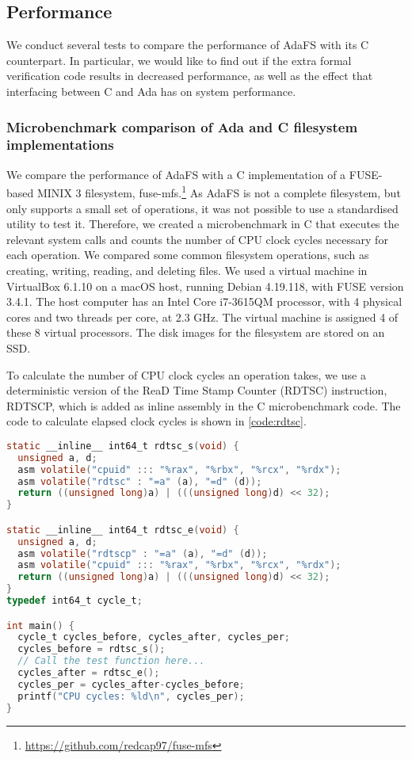 \subsection{Performance}
We conduct several tests to compare the performance of AdaFS with its C counterpart.
In particular, we would like to find out if the extra formal verification code results in decreased performance, as well as the effect that interfacing between C and Ada has on system performance.

\subsubsection{Microbenchmark comparison of Ada and C filesystem implementations}
We compare the performance of AdaFS with a C implementation of a FUSE-based MINIX 3 filesystem, fuse-mfs.\footnote{\url{https://github.com/redcap97/fuse-mfs}}
As AdaFS is not a complete filesystem, but only supports a small set of operations, it was not possible to use a standardised utility to test it.
Therefore, we created a microbenchmark in C that executes the relevant system calls and counts the number of CPU clock cycles necessary for each operation.
We compared some common filesystem operations, such as creating, writing, reading, and deleting files.
We used a virtual machine in VirtualBox 6.1.10 on a macOS host, running Debian 4.19.118, with FUSE version 3.4.1.
The host computer has an Intel Core i7-3615QM processor, with 4 physical cores and two threads per core, at 2.3 GHz.
The virtual machine is assigned 4 of these 8 virtual processors.
The disk images for the filesystem are stored on an SSD.

To calculate the number of CPU clock cycles an operation takes, we use a deterministic version of the ReaD Time Stamp Counter (RDTSC) instruction, RDTSCP, which is added as inline assembly in the C microbenchmark code.
The code to calculate elapsed clock cycles is shown in \autoref{code:rdtsc}.

\begin{lstlisting}[float=tb,caption={Calculating clock cycles}, label={code:rdtsc}, language=C]
static __inline__ int64_t rdtsc_s(void) {
  unsigned a, d;
  asm volatile("cpuid" ::: "%rax", "%rbx", "%rcx", "%rdx");
  asm volatile("rdtsc" : "=a" (a), "=d" (d));
  return ((unsigned long)a) | (((unsigned long)d) << 32);
}

static __inline__ int64_t rdtsc_e(void) {
  unsigned a, d;
  asm volatile("rdtscp" : "=a" (a), "=d" (d));
  asm volatile("cpuid" ::: "%rax", "%rbx", "%rcx", "%rdx");
  return ((unsigned long)a) | (((unsigned long)d) << 32);
}
typedef int64_t cycle_t;

int main() {
  cycle_t cycles_before, cycles_after, cycles_per;
  cycles_before = rdtsc_s();
  // Call the test function here...
  cycles_after = rdtsc_e();
  cycles_per = cycles_after-cycles_before;
  printf("CPU cycles: %ld\n", cycles_per);
}
\end{lstlisting}


